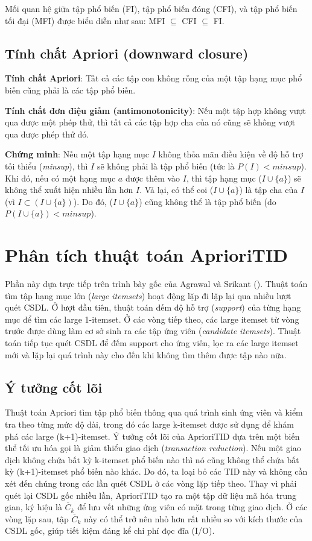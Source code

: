 Mối quan hệ giữa tập phổ biến (FI), tập phổ biến đóng (CFI), và tập phổ biến tối đại (MFI) được biểu diễn như sau: MFI $\subseteq$ CFI $\subseteq$ FI.

\subsection{Tính chất Apriori (downward closure)}
\label{sec:apriori-property}
\textbf{Tính chất Apriori}: Tất cả các tập con không rỗng của một tập hạng mục phổ biến cũng phải là các tập phổ biến.

\textbf{Tính chất đơn điệu giảm (antimonotonicity)}: Nếu một tập hợp không vượt qua được một phép thử, thì tất cả các tập hợp cha của nó cũng sẽ không vượt qua được phép thử đó.

\textbf{Chứng minh}: Nếu một tập hạng mục $I$ không thỏa mãn điều kiện về độ hỗ trợ tối thiểu (\textit{minsup}), thì $I$ sẽ không phải là tập phổ biến (tức là $P(I) < \textit{minsup}$). Khi đó, nếu có một hạng mục $a$ được thêm vào $I$, thì tập hạng mục ($I \cup \{a\}$) sẽ không thể xuất hiện nhiều lần hơn $I$. Vả lại, có thể coi ($I \cup \{a\}$) là tập cha của $I$ (vì $I \subset (I \cup \{a\})$). Do đó, ($I \cup \{a\}$) cũng không thể là tập phổ biến (do $P(I \cup \{a\}) < \textit{minsup}$).

\section{Phân tích thuật toán AprioriTID}
\label{sec:apriori-tid-analysis}
Phần này dựa trực tiếp trên trình bày gốc của Agrawal và Srikant (\cite{AgrawalSrikant1994}). Thuật toán tìm tập hạng mục lớn (\textit{large itemsets}) hoạt động lặp đi lặp lại qua nhiều lượt quét CSDL. Ở lượt đầu tiên, thuật toán đếm độ hỗ trợ (\textit{support}) của từng hạng mục để tìm các large 1-itemset. Ở các vòng tiếp theo, các large itemset từ vòng trước được dùng làm cơ sở sinh ra các tập ứng viên (\textit{candidate itemsets}). Thuật toán tiếp tục quét CSDL để đếm support cho ứng viên, lọc ra các large itemset mới và lặp lại quá trình này cho đến khi không tìm thêm được tập nào nữa.

\subsection{Ý tưởng cốt lõi}
Thuật toán Apriori tìm tập phổ biến thông qua quá trình sinh ứng viên và kiểm tra theo từng mức độ dài, trong đó các large k-itemset được sử dụng để khám phá các large (k+1)-itemset. Ý tưởng cốt lõi của AprioriTID dựa trên một biến thể tối ưu hóa gọi là giảm thiểu giao dịch (\textit{transaction reduction}). Nếu một giao dịch không chứa bất kỳ k-itemset phổ biến nào thì nó cũng không thể chứa bất kỳ (k+1)-itemset phổ biến nào khác. Do đó, ta loại bỏ các TID này và không cần xét đến chúng trong các lần quét CSDL ở các vòng lặp tiếp theo. Thay vì phải quét lại CSDL gốc nhiều lần, AprioriTID tạo ra một tập dữ liệu mã hóa trung gian, ký hiệu là $\overline{C}_k$ để lưu vết những ứng viên có mặt trong từng giao dịch. Ở các vòng lặp sau, tập $\overline{C}_k$ này có thể trở nên nhỏ hơn rất nhiều so với kích thước của CSDL gốc, giúp tiết kiệm đáng kể chi phí đọc đĩa (I/O).

